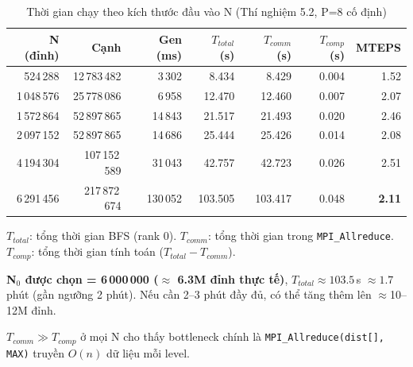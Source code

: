 \begin{table}[h]
\centering
\caption{Thời gian chạy theo kích thước đầu vào N (Thí nghiệm 5.2, P=8 cố định)}
\label{tab:scann}
\begin{tabular}{rrrrrrr}
\hline
\textbf{N (đỉnh)} & \textbf{Cạnh} &
\textbf{Gen (ms)} &
\textbf{$T_{total}$ (s)} &
\textbf{$T_{comm}$ (s)} &
\textbf{$T_{comp}$ (s)} &
\textbf{MTEPS} \\
\hline
524\,288    &  12\,783\,482 &  3\,302 &   8.434 &   8.429 & 0.004 & 1.52 \\
1\,048\,576  &  25\,778\,086 &  6\,958 &  12.470 &  12.460 & 0.007 & 2.07 \\
1\,572\,864  &  52\,897\,865 & 14\,843 &  21.517 &  21.493 & 0.020 & 2.46 \\
2\,097\,152  &  52\,897\,865 & 14\,686 &  25.444 &  25.426 & 0.014 & 2.08 \\
4\,194\,304  & 107\,152\,589 & 31\,043 &  42.757 &  42.723 & 0.026 & 2.51 \\
6\,291\,456  & 217\,872\,674 & 130\,052 & 103.505 & 103.417 & 0.048 & \textbf{2.11} \\
\hline
\end{tabular}
\begin{tablenotes}
\small
\item $T_{total}$: tổng thời gian BFS (rank 0).
      $T_{comm}$: tổng thời gian trong \texttt{MPI\_Allreduce}.
      $T_{comp}$: tổng thời gian tính toán ($T_{total} - T_{comm}$).
\item \textbf{N$_0$ được chọn = 6\,000\,000 ($\approx$ 6.3M đỉnh thực tế)},
      $T_{total} \approx 103.5$\,s $\approx 1.7$ phút (gần ngưỡng 2 phút).
      Nếu cần 2--3 phút đầy đủ, có thể tăng thêm lên $\approx$10--12M đỉnh.
\item $T_{comm} \gg T_{comp}$ ở mọi N cho thấy bottleneck chính là
      \texttt{MPI\_Allreduce(dist[], MAX)} truyền $O(n)$ dữ liệu mỗi level.
\end{tablenotes}
\end{table}


